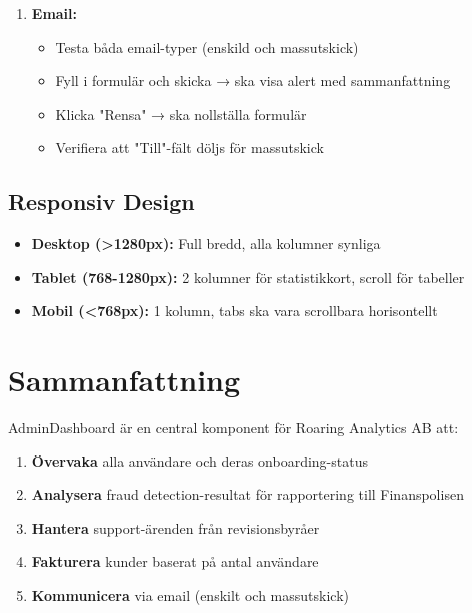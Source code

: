 \documentclass[12pt,a4paper]{article}
\begin{document}
\begin{enumerate}
  \item \textbf{Email:}
  \begin{itemize}
    \item Testa båda email-typer (enskild och massutskick)
    \item Fyll i formulär och skicka → ska visa alert med sammanfattning
    \item Klicka "Rensa" → ska nollställa formulär
    \item Verifiera att "Till"-fält döljs för massutskick
  \end{itemize}
\end{enumerate}

\subsection{Responsiv Design}
\begin{itemize}
  \item \textbf{Desktop (>1280px):} Full bredd, alla kolumner synliga
  \item \textbf{Tablet (768-1280px):} 2 kolumner för statistikkort, scroll för tabeller
  \item \textbf{Mobil (<768px):} 1 kolumn, tabs ska vara scrollbara horisontellt
\end{itemize}

\section{Sammanfattning}

AdminDashboard är en central komponent för Roaring Analytics AB att:

\begin{enumerate}
  \item \textbf{Övervaka} alla användare och deras onboarding-status
  \item \textbf{Analysera} fraud detection-resultat för rapportering till Finanspolisen
  \item \textbf{Hantera} support-ärenden från revisionsbyråer
  \item \textbf{Fakturera} kunder baserat på antal användare
  \item \textbf{Kommunicera} via email (enskilt och massutskick)
\end{enumerate}
\end{document}
